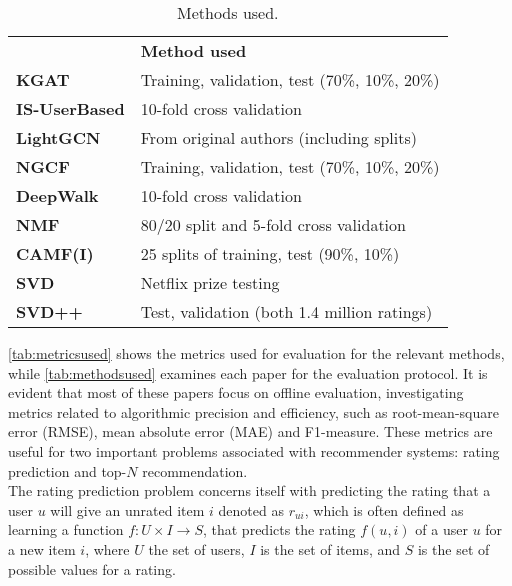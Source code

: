 \begin{table}[]\centering
    \caption{Methods used.}\label{tab:methodsused}
    \scriptsize
    \begin{tabular}{ll}\toprule
        &\textbf{Method used}\\\cmidrule{1-2}
        \textbf{KGAT\cite{KGAT}} & Training, validation, test (70\%, 10\%, 20\%) \\\cmidrule{1-2}
        \textbf{IS-UserBased\cite{GraphBasedCollaborativePaper}} & 10-fold cross validation  \\\cmidrule{1-2}
        \textbf{LightGCN\cite{LightGCN}} & From original authors (including splits) \\\cmidrule{1-2}
        \textbf{NGCF\cite{NGCF} } & Training, validation, test (70\%, 10\%, 20\%) \\\cmidrule{1-2}
        \textbf{DeepWalk\cite{DeepWalk}} & 10-fold cross validation \\\cmidrule{1-2}
        \textbf{NMF\cite{NMF} } & 80/20 split and 5-fold cross validation \\\cmidrule{1-2}
        \textbf{CAMF(I)\cite{baltrunasCAMF} } & 25 splits of training, test (90\%, 10\%) \\\cmidrule{1-2}
        \textbf{SVD\cite{standardMF} } & Netflix prize testing \\\cmidrule{1-2}
        \textbf{SVD++\cite{svd++} } & Test, validation (both 1.4 million ratings) \\\cmidrule{1-2}
    \bottomrule
    \end{tabular}
\end{table}
\autoref{tab:metricsused} shows the metrics used for evaluation for the relevant methods, while \autoref{tab:methodsused} examines each paper for the evaluation protocol.
It is evident that most of these papers focus on offline evaluation, investigating metrics related to algorithmic precision and efficiency, such as root-mean-square error (RMSE), mean absolute error (MAE) and F1-measure.
These metrics are useful for two important problems associated with recommender systems: rating prediction and top-$N$ recommendation\cite{RecommenderHandbook2015}.
\\
The rating prediction problem concerns itself with predicting the rating that a user $u$ will give an unrated item $i$ denoted as $r_{ui}$, which is often defined as learning a function $f : U \times I \rightarrow S$, that predicts the rating $f(u, i)$ of a user $u$ for a new item $i$, where $U$ the set of users, $I$ is the set of items, and $S$ is the set of possible values for a rating.
